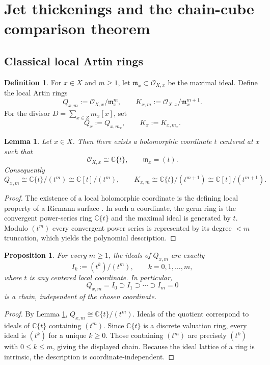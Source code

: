 \documentclass[11pt,a4paper]{article}
\newtheorem{proposition}[theorem]{Proposition}
\newtheorem{lemma}[theorem]{Lemma}
\theoremstyle{definition}
\newtheorem{definition}[theorem]{Definition}
\theoremstyle{remark}
\newcommand{\CC}{\mathbb C}
\newcommand{\cO}{\mathcal O}
\begin{document}
\section{Jet thickenings and the chain-cube comparison theorem}

\subsection{Classical local Artin rings}

\begin{definition}
For $x\in X$ and $m\ge1$, let $\mathfrak m_x\subset\cO_{X,x}$ be the maximal ideal.  Define the local Artin rings
\[
Q_{x,m}:=\cO_{X,x}/\mathfrak m_x^m,
\qquad
K_{x,m}:=\cO_{X,x}/\mathfrak m_x^{m+1}.
\]
For the divisor $D=\sum_{x\in Z}m_x[x]$, set
\[
Q_x:=Q_{x,m_x},\qquad K_x:=K_{x,m_x}.
\]
\end{definition}

\begin{lemma}\label{lem:dvr-local}
Let $x\in X$.  Then there exists a holomorphic coordinate $t$ centered at $x$ such that
\[
\cO_{X,x}\cong \CC\{t\},\qquad \mathfrak m_x=(t).
\]
Consequently
\[
Q_{x,m}\cong \CC\{t\}/(t^m)\cong \CC[t]/(t^m),
\qquad
K_{x,m}\cong \CC\{t\}/(t^{m+1})\cong \CC[t]/(t^{m+1}).
\]
\end{lemma}

\begin{proof}
The existence of a local holomorphic coordinate is the defining local property of a Riemann surface \cite[Chapter~1]{Lee}.  In such a coordinate, the germ ring is the convergent power-series ring $\CC\{t\}$ and the maximal ideal is generated by $t$.  Modulo $(t^m)$ every convergent power series is represented by its degree $<m$ truncation, which yields the polynomial description.
\end{proof}

\begin{proposition}\label{prop:ideal-chain-local}
For every $m\ge1$, the ideals of $Q_{x,m}$ are exactly
\[
I_k:=(t^k)/(t^m),\qquad k=0,1,\dots,m,
\]
where $t$ is any centered local coordinate.  In particular,
\[
Q_{x,m}=I_0\supset I_1\supset\cdots\supset I_m=0
\]
is a chain, independent of the chosen coordinate.
\end{proposition}

\begin{proof}
By Lemma \ref{lem:dvr-local}, $Q_{x,m}\cong\CC\{t\}/(t^m)$.  Ideals of the quotient correspond to ideals of $\CC\{t\}$ containing $(t^m)$.  Since $\CC\{t\}$ is a discrete valuation ring, every ideal is $(t^k)$ for a unique $k\ge0$.  Those containing $(t^m)$ are precisely $(t^k)$ with $0\le k\le m$, giving the displayed chain.  Because the ideal lattice of a ring is intrinsic, the description is coordinate-independent.
\end{proof}
\end{document}
